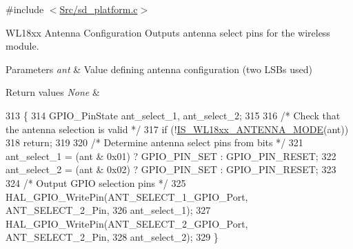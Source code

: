 {\ttfamily \#include $<$\mbox{\hyperlink{sd__platform_8c}{Src/sd\+\_\+platform.\+c}}$>$}



W\+L18xx Antenna Configuration Outputs antenna select pins for the wireless module. 


\begin{DoxyParams}{Parameters}
{\em ant} & Value defining antenna configuration (two L\+S\+Bs used) \\
\hline
\end{DoxyParams}

\begin{DoxyRetVals}{Return values}
{\em None} & \\
\hline
\end{DoxyRetVals}

\begin{DoxyCode}
313 \{
314     GPIO\_PinState ant\_select\_1, ant\_select\_2;
315  
316     \textcolor{comment}{/* Check that the antenna selection is valid */}
317     \textcolor{keywordflow}{if} (!\mbox{\hyperlink{group___s_d___platform___defines_ga4140f88e45c8ac3d94ec6ebd12950b27}{IS\_WL18xx\_ANTENNA\_MODE}}(ant))
318         \textcolor{keywordflow}{return};
319 
320     \textcolor{comment}{/* Determine antenna select pins from bits */}
321     ant\_select\_1 = (ant & 0x01) ? GPIO\_PIN\_SET : GPIO\_PIN\_RESET;
322     ant\_select\_2 = (ant & 0x02) ? GPIO\_PIN\_SET : GPIO\_PIN\_RESET;
323 
324     \textcolor{comment}{/* Output GPIO selection pins */}
325     HAL\_GPIO\_WritePin(ANT\_SELECT\_1\_GPIO\_Port, ANT\_SELECT\_2\_Pin,
326               ant\_select\_1);                           
327     HAL\_GPIO\_WritePin(ANT\_SELECT\_2\_GPIO\_Port, ANT\_SELECT\_2\_Pin,
328               ant\_select\_2);     
329 \}
\end{DoxyCode}

